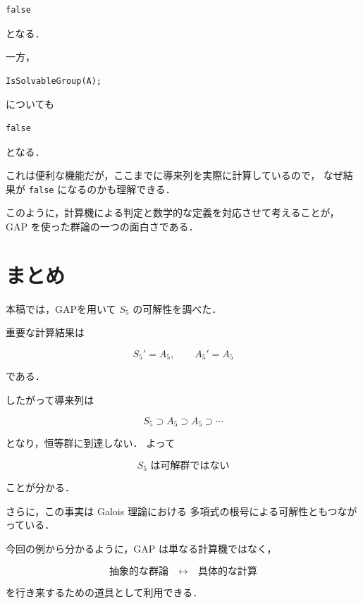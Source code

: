 \documentclass[a4paper,11pt]{jsarticle}
\begin{document}
\begin{lstlisting}
false
\end{lstlisting}

となる．

一方，

\begin{lstlisting}
IsSolvableGroup(A);
\end{lstlisting}

についても

\begin{lstlisting}
false
\end{lstlisting}

となる．

これは便利な機能だが，ここまでに導来列を実際に計算しているので，
なぜ結果が \texttt{false} になるのかも理解できる．

このように，計算機による判定と数学的な定義を対応させて考えることが，
GAP を使った群論の一つの面白さである．

\section{まとめ}

本稿では，GAPを用いて $S_5$ の可解性を調べた．

重要な計算結果は

$$
S_5'=A_5,
\qquad
A_5'=A_5
$$

である．

したがって導来列は

$$
S_5\supset A_5\supset A_5\supset\cdots
$$

となり，恒等群に到達しない．
よって

$$
\boxed{S_5\text{ は可解群ではない}}
$$

ことが分かる．

さらに，この事実は Galois 理論における
多項式の根号による可解性ともつながっている．

今回の例から分かるように，GAP は単なる計算機ではなく，

$$
\text{抽象的な群論}
\quad\longleftrightarrow\quad
\text{具体的な計算}
$$

を行き来するための道具として利用できる．


\end{document}
